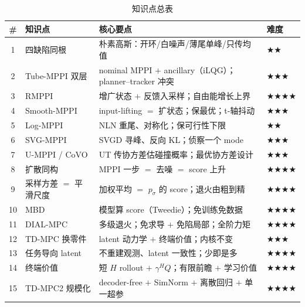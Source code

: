 \begin{table}[H]\centering\small
\caption{知识点总表}
\begin{tabular}{clll}
\toprule
\# & 知识点 & 核心要点 & 难度 \\
\midrule
1 & 四缺陷同根 & 朴素高斯：开环/白噪声/薄尾单峰/只传均值 & \(\bigstar\bigstar\) \\
2 & Tube-MPPI 双层 & nominal MPPI $+$ ancillary（iLQG）；planner--tracker 冲突 & \(\bigstar\bigstar\bigstar\) \\
3 & RMPPI & 增广状态 $+$ 反馈入采样；自由能增长上界 & \(\bigstar\bigstar\bigstar\bigstar\) \\
4 & Smooth-MPPI & input-lifting $=$ 扩状态；保最优；t-轴抖动 & \(\bigstar\bigstar\bigstar\) \\
5 & Log-MPPI & NLN 重尾、对称化；保可行性下限 & \(\bigstar\bigstar\) \\
6 & SVG-MPPI & SVGD 寻峰、反向 KL；侦察一个 mode & \(\bigstar\bigstar\bigstar\) \\
7 & U-MPPI / CoVO & UT 传协方差估碰撞概率；最优协方差设计 & \(\bigstar\bigstar\bigstar\) \\
8 & 扩散同构 & MPPI 一步 $=$ 去噪 $=$ score 上升 & \(\bigstar\bigstar\bigstar\bigstar\) \\
9 & 采样方差 $=$ 平滑尺度 & 加权平均 $=$ $p_\sigma$ 的 score；退火由粗到精 & \(\bigstar\bigstar\bigstar\bigstar\) \\
10 & MBD & 模型算 score（Tweedie）；免训练免数据 & \(\bigstar\bigstar\bigstar\bigstar\) \\
11 & DIAL-MPC & 多级退火；免求导 $+$ 免陷局部；全阶力矩 & \(\bigstar\bigstar\bigstar\bigstar\) \\
12 & TD-MPC 换零件 & latent 动力学 $+$ 终端价值；内核不变 & \(\bigstar\bigstar\bigstar\) \\
13 & 任务导向 latent & 不重建观测、latent 一致性；少即是多 & \(\bigstar\bigstar\bigstar\bigstar\) \\
14 & 终端价值 & 短 $H$ rollout $+$ $\gamma^H Q$；有限前瞻 $+$ 学习价值 & \(\bigstar\bigstar\bigstar\bigstar\) \\
15 & TD-MPC2 规模化 & decoder-free $+$ SimNorm $+$ 离散回归 $+$ 单一超参 & \(\bigstar\bigstar\bigstar\bigstar\) \\
\bottomrule
\end{tabular}
\end{table}

